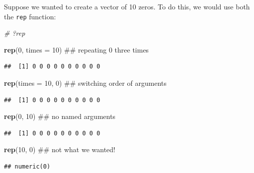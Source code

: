 \documentclass[]{article}
\newenvironment{Shaded}{\begin{snugshade}}{\end{snugshade}}
\newcommand{\KeywordTok}[1]{\textcolor[rgb]{0.13,0.29,0.53}{\textbf{#1}}}
\newcommand{\DataTypeTok}[1]{\textcolor[rgb]{0.13,0.29,0.53}{#1}}
\newcommand{\DecValTok}[1]{\textcolor[rgb]{0.00,0.00,0.81}{#1}}
\newcommand{\CommentTok}[1]{\textcolor[rgb]{0.56,0.35,0.01}{\textit{#1}}}
\newcommand{\NormalTok}[1]{#1}
\begin{document}
Suppose we wanted to create a vector of 10 zeros. To do this, we would
use both the \texttt{rep} function:

\vspace{0.25cm}

\begin{Shaded}
\begin{Highlighting}[]
\CommentTok{# ?rep}

\KeywordTok{rep}\NormalTok{(}\DecValTok{0}\NormalTok{, }\DataTypeTok{times =} \DecValTok{10}\NormalTok{)  ## repeating 0 three times}
\end{Highlighting}
\end{Shaded}

\begin{verbatim}
##  [1] 0 0 0 0 0 0 0 0 0 0
\end{verbatim}

\begin{Shaded}
\begin{Highlighting}[]
\KeywordTok{rep}\NormalTok{(}\DataTypeTok{times =} \DecValTok{10}\NormalTok{, }\DecValTok{0}\NormalTok{)  ## switching order of arguments}
\end{Highlighting}
\end{Shaded}

\begin{verbatim}
##  [1] 0 0 0 0 0 0 0 0 0 0
\end{verbatim}

\begin{Shaded}
\begin{Highlighting}[]
\KeywordTok{rep}\NormalTok{(}\DecValTok{0}\NormalTok{, }\DecValTok{10}\NormalTok{)  ## no named arguments}
\end{Highlighting}
\end{Shaded}

\begin{verbatim}
##  [1] 0 0 0 0 0 0 0 0 0 0
\end{verbatim}

\begin{Shaded}
\begin{Highlighting}[]
\KeywordTok{rep}\NormalTok{(}\DecValTok{10}\NormalTok{, }\DecValTok{0}\NormalTok{)  ## not what we wanted!}
\end{Highlighting}
\end{Shaded}

\begin{verbatim}
## numeric(0)
\end{verbatim}

\vspace{0.25cm}
\end{document}
